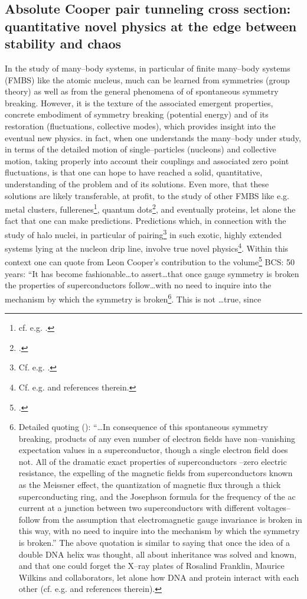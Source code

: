 \begin{subappendices}
\section[Absolute Cooper pair tunneling cross section]{Absolute Cooper pair tunneling cross section: quantitative novel physics at the edge between stability and chaos}\label{App3C}
In the study of many--body systems, in particular of finite many--body systems (FMBS) like the atomic nucleus, much can be learned from symmetries (group theory) as well as from the general phenomena of of spontaneous symmetry breaking. However, it is the texture of the associated emergent properties, concrete embodiment of symmetry breaking (potential energy) and of its restoration (fluctuations, collective modes), which provides insight into the eventual new physics. in fact, when one understands the many--body under study, in terms of the detailed motion of single--particles (nucleons) and collective motion, taking properly into account their couplings and associated zero point fluctuations, is that one can hope to have reached a solid, quantitative, understanding of the problem and of its solutions. Even more, that these solutions are likely transferable, at profit, to the study of other FMBS like e.g. metal clusters, fullerenes\footnote{cf. e.g. \cite{Broglia:04b}.}, quantum dots\footnote{\cite{Lipparini:03}.}, and eventually proteins, let alone the fact that one can make predictions. Predictions which, in connection with the study of halo nuclei, in particular of pairing\footnote{Cf. e.g. \cite{Broglia:13}.} in such exotic, highly extended systems lying at the nucleon drip line, involve true novel physics\footnote{Cf. e.g. \cite{Barranco:01,Tanihata:08,Potel:10} and references therein.}. Within this context one can quote from Leon Cooper's contribution to the volume\footnote{\cite{Cooper:11}.} BCS: 50 years: ``It has become fashionable\dots to assert\dots that once gauge symmetry is broken the properties of superconductors follow\dots with no need to inquire into the mechanism by which the symmetry is broken\footnote{Detailed quoting (\cite{Weinberg:11}): ``\dots In consequence of this spontaneous symmetry breaking, products of any even number of electron fields have non--vanishing expectation values in a superconductor, though a single electron field does not. All of the dramatic exact properties of superconductors --zero electric resistance, the expelling of the magnetic fields from superconductors known as the Meissner effect, the quantization of magnetic flux through a thick superconducting ring, and the Josephson formula for the frequency of the ac current at a junction between two superconductors with different voltages-- follow from the assumption that electromagnetic gauge invariance is broken in this way, with no need to inquire into the mechanism by which the symmetry is broken.'' The above quotation is similar to saying that once the idea of a double DNA helix was thought, all about inheritance was solved and known, and that one could forget the X--ray plates of Rosalind Franklin, Maurice Wilkins and collaborators, let alone how DNA and protein interact with each other (cf. e.g. \cite{Stent:80} and references therein).}. This is not \dots true, since 
\end{subappendices}
